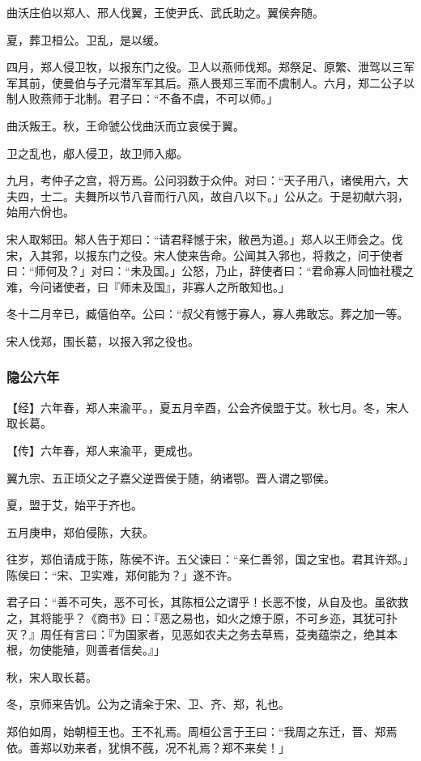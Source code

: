 \documentclass[]{article}
\begin{document}
曲沃庄伯以郑人、邢人伐翼，王使尹氏、武氏助之。翼侯奔随。

夏，葬卫桓公。卫乱，是以缓。

四月，郑人侵卫牧，以报东门之役。卫人以燕师伐郑。郑祭足、原繁、泄驾以三军军其前，使曼伯与子元潜军军其后。燕人畏郑三军而不虞制人。六月，郑二公子以制人败燕师于北制。君子曰：``不备不虞，不可以师。」

曲沃叛王。秋，王命虢公伐曲沃而立哀侯于翼。

卫之乱也，郕人侵卫，故卫师入郕。

九月，考仲子之宫，将万焉。公问羽数于众仲。对曰：``天子用八，诸侯用六，大夫四，士二。夫舞所以节八音而行八风，故自八以下。」公从之。于是初献六羽，始用六佾也。

宋人取邾田。邾人告于郑曰：``请君释憾于宋，敝邑为道。」郑人以王师会之。伐宋，入其郛，以报东门之役。宋人使来告命。公闻其入郛也，将救之，问于使者曰：``师何及？」对曰：``未及国。」公怒，乃止，辞使者曰：``君命寡人同恤社稷之难，今问诸使者，曰『师未及国』，非寡人之所敢知也。」

冬十二月辛已，臧僖伯卒。公曰：``叔父有憾于寡人，寡人弗敢忘。葬之加一等。

宋人伐郑，围长葛，以报入郛之役也。

\hypertarget{header-n78}{%
\subsubsection{隐公六年 }\label{header-n78}}

【经】六年春，郑人来渝平。，夏五月辛酉，公会齐侯盟于艾。秋七月。冬，宋人取长葛。

【传】六年春，郑人来渝平，更成也。

翼九宗、五正顷父之子嘉父逆晋侯于随，纳诸鄂。晋人谓之鄂侯。

夏，盟于艾，始平于齐也。

五月庚申，郑伯侵陈，大获。

往岁，郑伯请成于陈，陈侯不许。五父谏曰：``亲仁善邻，国之宝也。君其许郑。」陈侯曰：``宋、卫实难，郑何能为？」遂不许。

君子曰：``善不可失，恶不可长，其陈桓公之谓乎！长恶不悛，从自及也。虽欲救之，其将能乎？《商书》曰：『恶之易也，如火之燎于原，不可乡迩，其犹可扑灭？』周任有言曰：『为国家者，见恶如农夫之务去草焉，芟夷蕴崇之，绝其本根，勿使能殖，则善者信矣。』」

秋，宋人取长葛。

冬，京师来告饥。公为之请籴于宋、卫、齐、郑，礼也。

郑伯如周，始朝桓王也。王不礼焉。周桓公言于王曰：``我周之东迁，晋、郑焉依。善郑以劝来者，犹惧不蔇，况不礼焉？郑不来矣！」
\end{document}
